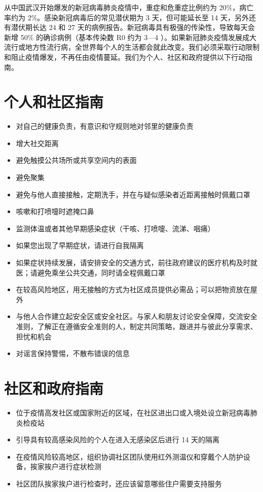 \documentclass[onecolumn,journal]{IEEEtran}
\begin{document}

从中国武汉开始爆发的新冠病毒肺炎疫情中，重症和危重症比例约为 20\%，病亡率约为 2\%。感染新冠病毒后的常见潜伏期为 3 天，但可能延长至 14 天，另外还有潜伏期长达 24 和 27 天的病例报告。新冠病毒具有极强的传染性，导致每天会新增 50\% 的确诊病例（基本传染数 R0 约为 3—4 ）。如果新冠肺炎疫情发展成大流行或地方性流行病，全世界每个人的生活都会就此改变。我们必须采取行动限制和阻止疫情爆发，不再任由疫情蔓延。我们为个人、社区和政府提供以下行动指南。 

\begin{multicols}{2}
\section*{个人和社区指南}
\begin{itemize}
\item 对自己的健康负责，有意识和守规则地对邻里的健康负责
\item 增大社交距离
\item 避免触摸公共场所或共享空间内的表面
\item 避免聚集 
\item 避免与他人直接接触，定期洗手，并在与疑似感染者近距离接触时佩戴口罩
\item 咳嗽和打喷嚏时遮掩口鼻
\item 监测体温或者其他早期感染症状（干咳、打喷嚏、流涕、咽痛）
\item 如果您出现了早期症状，请进行自我隔离
\item 如果症状持续发展，请安排安全的交通方式，前往政府建议的医疗机构及时就医；请避免乘坐公共交通，同时请全程佩戴口罩
\item 在较高风险地区，用无接触的方式为社区成员提供必需品；可以把物资放在屋外
\item 与他人合作建立起安全区或安全社区。与家人和朋友讨论安全保障，交流安全准则，了解正在遵循安全准则的人，制定共同策略，跟进并与彼此分享需求、担忧和机会
\item 对谣言保持警惕，不散布错误的信息
\end{itemize}

\vspace{2ex}

\section*{社区和政府指南}
\begin{itemize}
\item 位于疫情高发社区或国家附近的区域，在社区进出口或入境处设立新冠病毒肺炎检疫站
\item 引导具有较高感染风险的个人在进入无感染区后进行 14 天的隔离
\item 在疫情风险较高地区，组织协调社区团队使用红外测温仪和穿戴个人防护设备，挨家挨户进行症状检测
\item 社区团队挨家挨户进行检查时，还应该留意哪些住户需要支持服务


\end{itemize}
\end{multicols}
\end{document}
